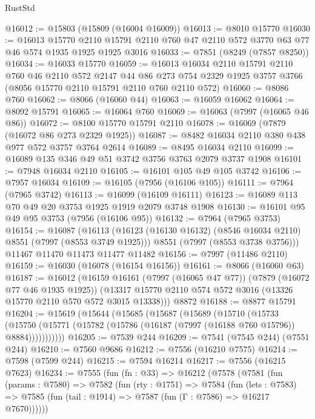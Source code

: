 \begin{lexlean}{RustStd}
\begin{coremodule}
@16012 := @15803 (@15809 (@16004 @16009))
@16013 := @8010 @15770
@16030 := @16013
    @15770
    @2110
    @15791
    @2110
    @760
    @47
    @2110
    @572
    @3770
    @63
    @77
    @46
    @574
    @1935
    @1925
    @1925
    @3016
@16033 := @7851 (@8249 (@7857 @8250))
@16034 := @16033 @15770
@16059 := @16013
    @16034
    @2110
    @15791
    @2110
    @760
    @46
    @2110
    @572
    @2147
    @44
    @86
    @273
    @754
    @2329
    @1925
    @3757
    @3766
    (@8056 @15770 @2110 @15791 @2110 @760 @2110 @572)
@16060 := @8086 @760
@16062 := @8066 (@16060 @44)
@16063 := @16059 @16062
@16064 := @8092 @15791
@16065 := @16064 @760
@16069 := @16063 (@7997 (@16065 @46 @86))
@16072 := @8100 @15770 @15791 @2110
@16078 := @16069 (@7879 (@16072 @86 @273 @2329 @1925))
@16087 := @8482 @16034 @2110 @380 @438 @977 @572 @3757 @3764 @2614
@16089 := @8495 @16034 @2110
@16099 := @16089 @135 @346 @49 @51 @3742 @3756 @3763 @2079 @3737 @1908
@16101 := @7948 @16034 @2110
@16105 := @16101 @105 @49 @105 @3742
@16106 := @7957 @16034
@16109 := @16105 (@7956 (@16106 @105))
@16111 := @7964 (@7965 @3742)
@16113 := @16099 (@16109 @16111)
@16123 := @16089 @113 @70 @49 @20 @3753 @1925 @1919 @2079 @3748 @1908
@16130 := @16101 @95 @49 @95 @3753 (@7956 (@16106 @95))
@16132 := @7964 (@7965 @3753)
@16154 := @16087
    (@16113
      (@16123 (@16130 @16132) (@8546 @16034 @2110) @8551 (@7997 (@8553 @3749 @1925)))
      @8551
      (@7997 (@8553 @3738 @3756)))
    @11467
    @11470
    @11473
    @11477
    @11482
@16156 := @7997 (@11486 @2110)
@16159 := @16030 (@16078 (@16154 @16156))
@16161 := @8066 (@16060 @63)
@16187 := @16012
    (@16159
      @16161
      (@7997 (@16065 @47 @77))
      (@7879 (@16072 @77 @46 @1935 @1925))
      (@13317 @15770 @2110 @574 @572 @3016 (@13326 @15770 @2110 @570 @572 @3015 @13338)))
    @8872
@16188 := @8877 @15791
@16204 := @15619
    (@15644
      (@15685
        (@15687
          (@15689
            (@15710
              (@15733
                (@15750
                  (@15771 (@15782 (@15786 (@16187 (@7997 (@16188 @760 @15796)) @8884)))))))))))
@16205 := @7539 @244
@16209 := @7541 (@7545 @244) (@7551 @244)
@16210 := @7560 @9686
@16212 := @7556 (@16210 @7575)
@16214 := @7598 (@7599 @244)
@16215 := @7594 @16214
@16217 := @7556 (@16215 @7623)
@16234 := @7555
    (fun (fn : @33) =>
    @16212
      (@7578
        (@7581
          (fun (params : @7580) =>
          @7582
            (fun (rty : @1751) =>
            @7584
              (fun (lets : @7583) =>
              @7585 (fun (tail : @1914) => @7587 (fun (Γ : @7586) => @16217 @7670))))))

\end{coremodule}
\end{lexlean}
